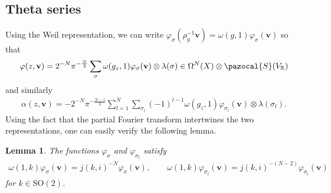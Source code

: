 \documentclass[a4paper,11pt]{amsart} %
\newcommand{\8}{\infty}
\newcommand{\Z}{\mathbb{Z}}
\newcommand{\vbf}{\mathbf{v}}
\newcommand{\SO}{\mathrm{SO}}
\newcommand{\SL}{\mathrm{SL}}
\newcommand{\R}{\mathbb{R}}
\newcommand{\C}{\mathbb{C}}
\newcommand{\Scal}{\pazocal{S}}
\newcommand{\Lcal}{\pazocal{L}}
\theoremstyle{mytheoremstyle}
\newtheorem{lem}[thm]{Lemma}
\theoremstyle{remark}
\numberwithin{equation}{section}
\begin{document}
\subsection{Theta series} \label{sec:thetadiffforms} %

Using the Weil representation, we can write $\varphi_\sigma(\rho_g^{-1}\vbf)=\omega(g,1)\varphi_\sigma(\vbf)$ so that
    \begin{align}
    \varphi(z,\vbf)= 2^{-N}\pi^{-\frac{N}{2}}\sum_{\sigma}\omega(g_z,1)\varphi_\sigma(\vbf) \otimes \lambda(\sigma) \in \Omega^N(X) \otimes \Scal(V_\R)
\end{align}
and similarly
 \begin{align}
    \alpha(z,\vbf)=-2^{-N}\pi^{-\frac{N-1}{2}} \sum_{l=1}^N \sum_{\sigma_l}(-1)^{l-1} \omega(g_z,1)\varphi_{\sigma_l}(\vbf) \otimes \lambda(\sigma_l).
\end{align}
Using the fact that the partial Fourier transform intertwines the two representations, one can easily verify the following lemma. 
\begin{lem} \label{soinv}
The functions $\varphi_\sigma$ and $\varphi_{\sigma_l}$  satisfy
\begin{align}
\omega(1,k)\varphi_\sigma(\vbf)=j(k,i)^{-N}\varphi_\sigma(\vbf), \qquad \omega(1,k)\varphi_{\sigma_l}(\vbf)=j(k,i)^{-(N-2)}\varphi_{\sigma_l}(\vbf)
\end{align}
for $k \in \SO(2)$.
\end{lem}
\end{document}

